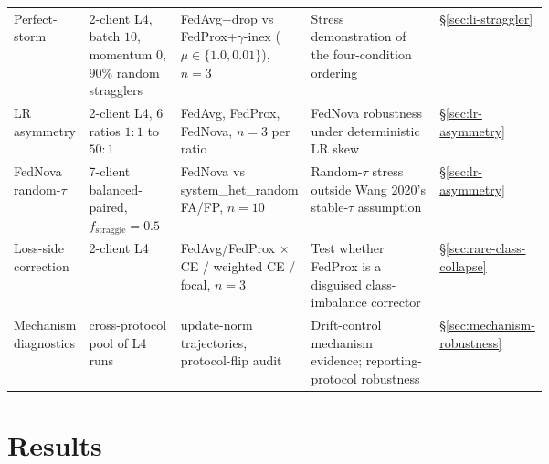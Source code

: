 \documentclass[11pt,a4paper]{report}
\begin{document}
\begin{table}[H]
{\begin{tabular}{l p{0.18\linewidth} p{0.22\linewidth} p{0.28\linewidth} l}
Perfect-storm                    & 2-client L4, batch $10$, momentum $0$, $90\%$ random stragglers & FedAvg+drop vs FedProx+$\gamma$-inex ($\mu \in \{1.0, 0.01\}$), $n = 3$ & Stress demonstration of the four-condition ordering                        & §\ref{sec:li-straggler}                         \\
LR asymmetry                     & 2-client L4, 6 ratios $1{:}1$ to $50{:}1$    & FedAvg, FedProx, FedNova, $n = 3$ per ratio              & FedNova robustness under deterministic LR skew                                & §\ref{sec:lr-asymmetry}                         \\
FedNova random-$\tau$            & 7-client balanced-paired, $f_{\textrm{straggle}} = 0.5$ & FedNova vs system\_het\_random FA/FP, $n = 10$           & Random-$\tau$ stress outside Wang 2020's stable-$\tau$ assumption             & §\ref{sec:lr-asymmetry}                         \\
Loss-side correction             & 2-client L4                                  & FedAvg/FedProx $\times$ CE / weighted CE / focal, $n = 3$ & Test whether FedProx is a disguised class-imbalance corrector                & §\ref{sec:rare-class-collapse}                  \\
Mechanism diagnostics            & cross-protocol pool of L4 runs               & update-norm trajectories, protocol-flip audit             & Drift-control mechanism evidence; reporting-protocol robustness               & §\ref{sec:mechanism-robustness}                  \\
\hline
\end{tabular}%
}
\end{table}




\chapter{Results}
\label{ch:results}


\end{document}
